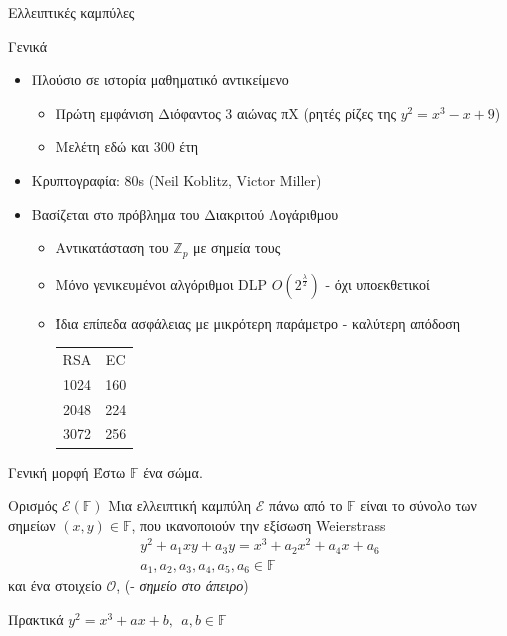 \documentclass[handout]{beamer}
\begin{document}
\begin{frame}{Ελλειπτικές καμπύλες}
\begin{block}{Γενικά}
\begin{itemize}
\item Πλούσιο σε ιστορία μαθηματικό αντικείμενο
\begin{itemize}
	\item Πρώτη εμφάνιση Διόφαντος 3 αιώνας πΧ (ρητές ρίζες της $y^2 = x^3-x+9$)
	\item Μελέτη εδώ και 300 έτη \pause
\end{itemize}
\item Κρυπτογραφία: 80s (Neil Koblitz, Victor Miller) \pause
\item Βασίζεται στο πρόβλημα του Διακριτού Λογάριθμου \pause
\begin{itemize}
\item Αντικατάσταση του $\mathbb{Z}_{p}$ με σημεία τους \pause
\item Μόνο γενικευμένοι αλγόριθμοι DLP $O(2^\frac{\lambda}{2})$ - όχι υποεκθετικοί \pause
\item Ίδια επίπεδα ασφάλειας με μικρότερη παράμετρο - καλύτερη απόδοση\\
\begin{tabular}{cc}
RSA & EC \\
1024 & 160 \\
2048 & 224 \\
3072 & 256 \\
\end{tabular}
\end{itemize}
\end{itemize}
\end{block}
\end{frame}

\begin{frame}{Γενική μορφή}
Έστω $\mathbb F$ ένα σώμα.
\pause
\begin{block}{Ορισμός $\mathcal{E}(\mathbb{F})$}
Mια ελλειπτική καμπύλη $\mathcal{E}$ πάνω από το $\mathbb F$ είναι το σύνολο των σημείων  $(x,y) \in \mathbb F$, που ικανοποιούν την εξίσωση Weierstrass 
\begin{align*}
y^2+a_1xy+a_3y=x^3+a_2x^2+a_4x+a_6 \\  a_1, a_2, a_3, a_4, a_5, a_6 \in \mathbb{F}
\end{align*}  
 και  ένα στοιχείο $\mathcal O$, (- \emph{σημείο στο άπειρο})
\end{block}
\pause
\begin{block}{Πρακτικά} 
$
y^2=x^3+ax+b ,\ \ a, b \in \mathbb F\  
$

\end{block}
\end{frame}
\end{document}
